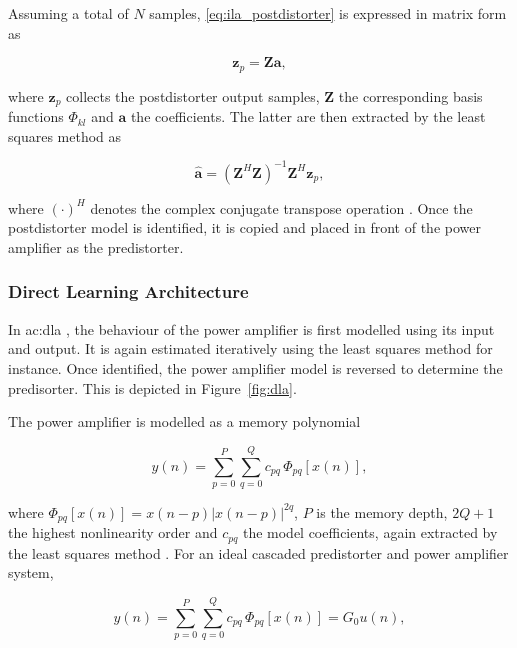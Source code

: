 Assuming a total of $N$ samples, \eqref{eq:ila_postdistorter} is expressed in matrix form as

\begin{equation}
  \mathbf{z}_p = \mathbf{Z}\mathbf{a},
  \label{eq:ila_matrix}
\end{equation}

where $\mathbf{z}_p$ collects the postdistorter output samples, $\mathbf{Z}$ the corresponding basis functions $\Phi_{kl}$ and $\mathbf{a}$ the coefficients. The latter are then extracted by the least squares method as

\begin{equation}
  \hat{\mathbf{a}} = \left(\mathbf{Z}^H\mathbf{Z}\right)^{-1}\mathbf{Z}^H\mathbf{z}_p,
  \label{eq:ila_least_squares}
\end{equation}

where $(\cdot)^H$ denotes the complex conjugate transpose operation \cite{feng2016}. Once the postdistorter model is identified, it is copied and placed in front of the power amplifier as the predistorter. 

\subsubsection{Direct Learning Architecture}\label{sec:direct_learning_architecture}

In \gls{ac:dla} \cite{kim2001, zhou2007, cottais2006}, the behaviour of the power amplifier is first modelled using its input and output. It is again estimated iteratively using the least squares method for instance. Once identified, the power amplifier model is reversed to determine the predisorter. This is depicted in Figure~\ref{fig:dla}.

The power amplifier is modelled as a memory polynomial

\begin{equation}
  y(n) = \sum_{p=0}^{P}\sum_{q=0}^{Q} c_{pq}\,\Phi_{pq}\!\left[x(n)\right],
  \label{eq:dla_pa_model}
\end{equation}

where $\Phi_{pq}[x(n)] = x(n-p)|x(n-p)|^{2q}$, $P$ is the memory depth, $2Q+1$ the highest nonlinearity order and $c_{pq}$ the model coefficients, again extracted by the least squares method \cite{feng2016}. For an ideal cascaded predistorter and power amplifier system,

\begin{equation}
  y(n) = \sum_{p=0}^{P}\sum_{q=0}^{Q} c_{pq}\,\Phi_{pq}\!\left[x(n)\right] = G_0 u(n),
  \label{eq:dla_ideal}
\end{equation}

